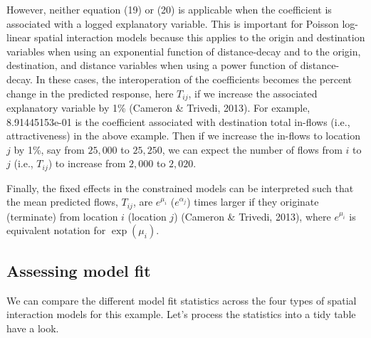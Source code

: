 \documentclass[11pt]{article}
\begin{document}
However, neither equation (19) or (20) is applicable when the
coefficient is associated with a logged explanatory variable. This is
important for Poisson log-linear spatial interaction models because this
applies to the origin and destination variables when using an
exponential function of distance-decay and to the origin, destination,
and distance variables when using a power function of distance-decay. In
these cases, the interoperation of the coefficients becomes the percent
change in the predicted response, here \(T_{ij}\), if we increase the
associated explanatory variable by 1\% (Cameron \& Trivedi, 2013). For
example, 8.91445153e-01 is the coefficient associated with destination
total in-flows (i.e., attractiveness) in the above example. Then if we
increase the in-flows to location \(j\) by 1\%, say from \(25,000\) to
\(25,250\), we can expect the number of flows from \(i\) to \(j\) (i.e.,
\(T_{ij}\)) to increase from \(2,000\) to \(2,020\).

Finally, the fixed effects in the constrained models can be interpreted
such that the mean predicted flows, \(T_{ij}\), are \(e^{\mu_{i}}\)
(\(e^{\alpha_{j}}\)) times larger if they originate (terminate) from
location \(i\) (location \(j\)) (Cameron \& Trivedi, 2013), where
\(e^{\mu_{i}}\) is equivalent notation for \(\exp(\mu_{i})\).

    \subsection{Assessing model fit}\label{assessing-model-fit}

    We can compare the different model fit statistics across the four types
of spatial interaction models for this example. Let's process the
statistics into a tidy table have a look.
\end{document}
